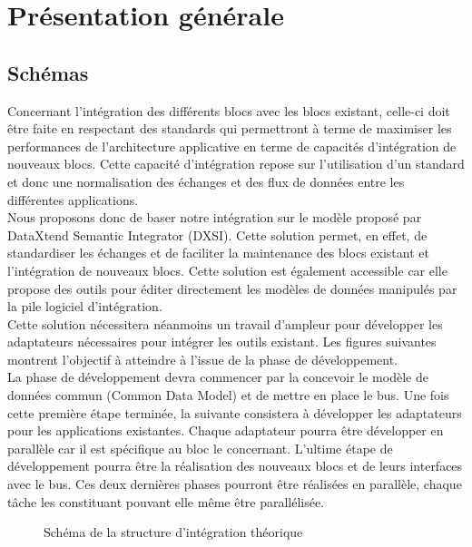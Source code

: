 \section{Présentation générale}

\subsection{Schémas}

Concernant l’intégration des différents blocs avec les blocs existant, celle-ci doit être faite en respectant des standards qui permettront à terme de maximiser les performances de l’architecture applicative en terme de capacités d’intégration de nouveaux blocs. Cette capacité d’intégration repose sur l’utilisation d’un standard et donc une normalisation des échanges et des flux de données entre les différentes applications. \\

Nous proposons donc de baser notre intégration sur le modèle proposé par DataXtend Semantic Integrator (DXSI). Cette solution permet, en effet, de standardiser les échanges et de faciliter la maintenance des blocs existant et l’intégration de nouveaux blocs. Cette solution est également accessible car elle propose des outils pour éditer directement les modèles de données manipulés par la pile logiciel d’intégration. \\

Cette solution nécessitera néanmoins un travail d’ampleur pour développer les adaptateurs nécessaires pour intégrer les outils existant. Les figures suivantes montrent l’objectif à atteindre à l’issue de la phase de développement. \\
    
La phase de  développement devra commencer par la concevoir le modèle de données commun (Common Data Model) et de mettre en place le bus. Une fois cette première étape terminée, la suivante consistera à développer les adaptateurs pour les applications existantes. Chaque adaptateur pourra être développer en parallèle car il est spécifique au bloc le concernant. L’ultime étape de développement pourra être la réalisation des nouveaux blocs et de leurs interfaces avec le bus. Ces deux dernières phases pourront être réalisées en parallèle, chaque tâche les constituant pouvant elle même être parallélisée. \\

\begin{figure}[H]
    \label{fig-bus}
    \noindent{}
    \caption{Schéma de la structure d'intégration théorique}
\end{figure}

